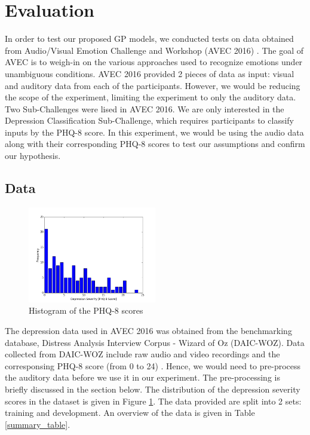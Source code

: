 \documentclass{article}
\begin{document}
	\section{Evaluation}
	In order to test our proposed GP models, we conducted tests on data obtained from Audio/Visual Emotion Challenge and Workshop (AVEC 2016) \cite{avec2016}. 
	The goal of AVEC is to weigh-in on the various approaches used to recognize emotions under unambiguous conditions. 
	AVEC 2016 provided 2 pieces of data as input: visual and auditory data from each of the participants. 
	However, we would be reducing the scope of the experiment, limiting the experiment to only the auditory data. 
	Two Sub-Challenges were lised in AVEC 2016. 
	We are only interested in the Depression Classification Sub-Challenge, which requires participants to classify inputs by the PHQ-8 score. 
	In this experiment, we would be using the audio data along with their corresponding PHQ-8 scores to test our assumptions and confirm our hypothesis.

	\subsection{Data}
	\begin{figure}[h]
	\center
 	\includegraphics[width=0.5\textwidth]{histogram_phq8}
	\caption{Histogram of the PHQ-8 scores}
	\label{histogram_phq8}
	\end{figure}
	
	The depression data used in AVEC 2016 was obtained from the benchmarking database, Distress Analysis Interview Corpus - Wizard of Oz (DAIC-WOZ). 
	Data collected from DAIC-WOZ include raw audio and video recordings and the corresponsing PHQ-8 score (from 0 to 24) \cite{jad2008}. Hence, we would 
	need to pre-process the auditory data before we use it in our experiment. The pre-processing is briefly discussed in the section below.
	The distribution of the depression severity scores in the dataset is given in Figure \ref{histogram_phq8}. 
	The data provided are split into 2 sets: training and development.
	An overview of the data is given in Table \ref{summary_table}.
\end{document}
